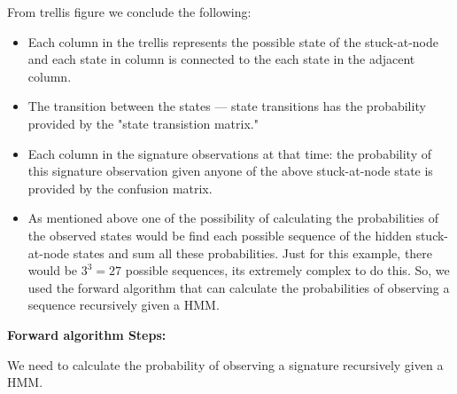 From trellis figure we conclude the following:

\begin{itemize}

\item Each column in the trellis represents the possible state of the stuck-at-node and each state in column is connected to the each state in the adjacent column.

\item The transition between the states --- state transitions has the probability provided by the "state transistion matrix."

\item Each column in the signature observations at that time: the probability of this signature observation given anyone of the above stuck-at-node state is provided by the confusion matrix. 

\item As mentioned above one of the possibility of calculating the probabilities of the observed states would be find each possible sequence of the hidden stuck-at-node states and sum all these probabilities. Just for this example, there would be $3^3 = 27$ possible sequences, its extremely complex to do this. So, we used the forward algorithm that can calculate the probabilities of observing a sequence recursively given a HMM.

\end{itemize}

\textbf{Forward algorithm Steps:}

We need to calculate the probability of observing a signature recursively given a HMM. 

